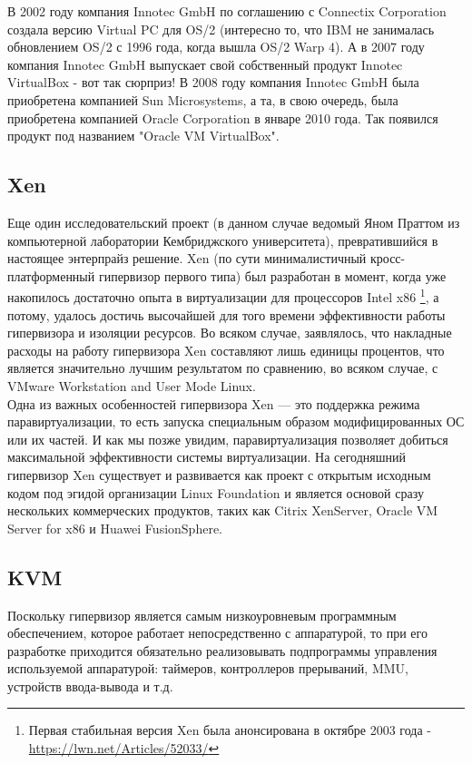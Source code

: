 \documentclass[14pt, a4paper]{article}
\begin{document}
В 2002 году компания Innotec GmbH по соглашению с Connectix Corporation создала
версию Virtual PC для OS/2 (интересно то, что IBM не занималась обновлением OS/2 с
1996 года, когда вышла OS/2 Warp 4). А в 2007 году компания Innotec GmbH выпускает
свой собственный продукт Innotec VirtualBox - вот так сюрприз!
В 2008 году компания Innotec GmbH была приобретена компанией Sun Microsystems, а
та, в свою очередь, была приобретена компанией Oracle Corporation в январе 2010
года. Так появился продукт под названием "Oracle VM VirtualBox".

\subsection*{Xen}

Еще один исследовательский проект (в данном случае ведомый Яном Праттом из
компьютерной лаборатории Кембриджского университета), превратившийся в
настоящее энтерпрайз решение. Xen (по сути минималистичный
кросс-платформенный гипервизор первого типа) был разработан в момент, когда уже
накопилось достаточно опыта в виртуализации для процессоров Intel x86 \footnote{Первая стабильная версия Xen была анонсирована в октябре 2003 года -
\href{https://lwn.net/Articles/52033/}{https://lwn.net/Articles/52033/}}, а потому,
удалось достичь высочайшей для того времени эффективности работы гипервизора и
изоляции ресурсов. Во всяком случае, заявлялось, что накладные расходы на работу
гипервизора Xen составляют лишь единицы процентов, что является значительно
лучшим результатом по сравнению, во всяком случае, с VMware Workstation and User
Mode Linux.\\


Одна из важных особенностей гипервизора Xen — это поддержка режима
паравиртуализации, то есть запуска специальным образом модифицированных ОС
или их частей. И как мы позже увидим, паравиртуализация позволяет добиться
максимальной эффективности системы виртуализации.
На сегодняшний гипервизор Xen существует и развивается как проект с открытым
исходным кодом под эгидой организации Linux Foundation и является основой сразу
нескольких коммерческих продуктов, таких как Citrix XenServer, Oracle VM Server for
x86 и Huawei FusionSphere.

\subsection*{KVM}

Поскольку гипервизор является самым низкоуровневым программным обеспечением,
которое работает непосредственно с аппаратурой, то при его разработке приходится
обязательно реализовывать подпрограммы управления используемой аппаратурой:
таймеров, контроллеров прерываний, MMU, устройств ввода-вывода и т.д.\\
\end{document}
